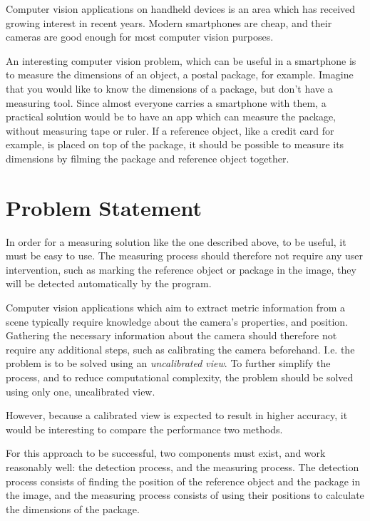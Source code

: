 Computer vision applications on handheld devices is an area which has received growing interest in recent years. 
Modern smartphones are cheap, and their cameras are good enough for most computer vision purposes.

An interesting computer vision problem, which can be useful in a smartphone is to measure the dimensions of an object, a postal package, for example.
Imagine that you would like to know the dimensions of a package, but don't have a measuring tool.
Since almost everyone carries a smartphone with them, a practical solution would be to have an app which can measure the package, without measuring tape or ruler.
If a reference object, like a credit card for example, is placed on top of the package, it should be possible to measure its dimensions by filming the package and reference object together.

\section{Problem Statement}\label{problem-statement}
In order for a measuring solution like the one described above, to be useful, it must be easy to use. %
The measuring process should therefore not require any user intervention, such as marking the reference object or package in the image, they will be detected automatically by the program.

Computer vision applications which aim to extract metric information from a scene typically require knowledge about the camera's properties, and position.
Gathering the necessary information about the camera should therefore not require any additional steps, such as calibrating the camera beforehand.
I.e. the problem is to be solved using an \textit{uncalibrated view}.
To further simplify the process, and to reduce computational complexity, the problem should be solved using only one, uncalibrated view.

However, because a calibrated view is expected to result in higher accuracy, it would be interesting to compare the performance two methods.

For this approach to be successful, two components must exist, and work reasonably well: the detection process, and the measuring process.
The detection process consists of finding the position of the reference object and the package in the image, and the measuring process consists of using their positions to calculate the dimensions of the package.

